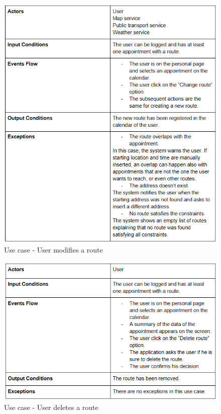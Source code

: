 \begin{figure}
	\centering
	\includegraphics{Images/UseCaseTables/7_usr_mod_route.png}
	\caption{\label{fig:useCase7}Use case - User modifies a route}
\end{figure}

\begin{figure}
	\centering
	\includegraphics{Images/UseCaseTables/8_usr_del_route.PNG}
	\caption{\label{fig:useCase8}Use case - User deletes a route }
\end{figure}

